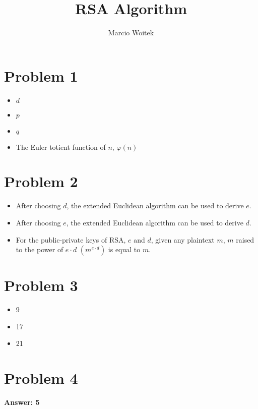 \documentclass[11pt]{article}
\author{Marcio Woitek}
\date{}
\title{RSA Algorithm}
\begin{document}
\maketitle
\thispagestyle{empty}
\pagestyle{empty}

\section*{Problem 1}
\label{sec:org700870a}
\begin{itemize}
\item \(d\)
\item \(p\)
\item \(q\)
\item The Euler totient function of \(n\), \(\varphi(n)\)
\end{itemize}

\section*{Problem 2}
\label{sec:org2dd71e5}
\begin{itemize}
\item After choosing \(d\), the extended Euclidean algorithm can be used to derive \(e\).
\item After choosing \(e\), the extended Euclidean algorithm can be used to derive \(d\).
\item For the public-private keys of RSA, \(e\) and \(d\), given any plaintext
\(m\), \(m\) raised to the power of \(e\cdot d\) \(\left(m^{e\cdot d}\right)\)
is equal to \(m\).
\end{itemize}

\section*{Problem 3}
\label{sec:orgf66df00}
\begin{itemize}
\item 9
\item 17
\item 21
\end{itemize}

\section*{Problem 4}
\label{sec:org3645bed}
\textbf{Answer: 5}\\[0pt]
\end{document}
